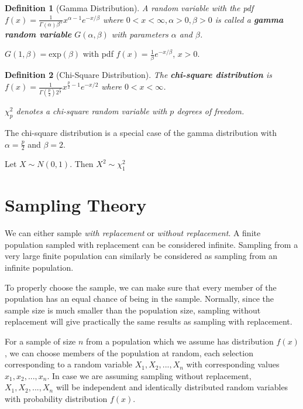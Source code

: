\documentclass[12pt,twoside]{report}
\newtheorem{defn}{Definition}
\begin{document}
\begin{defn}[Gamma Distribution]
    A random variable with the pdf $f(x) = \displaystyle  \frac{1}{\Gamma(\alpha) \beta^\alpha} x^{\alpha - 1} e^{-x/\beta}$ where $0 < x < \infty, \alpha > 0, \beta > 0$ is called a \textbf{gamma random variable} $G(\alpha, \beta)$ with parameters $\alpha$ and $\beta$. 
\end{defn}
$G(1, \beta) = \text{exp}(\beta)$ with pdf $f(x) = \frac{1}{\beta} e^{-x/\beta}$, $x > 0$.

\begin{defn}[Chi-Square Distribution]
    The \textbf{chi-square distribution} is \\
    $f(x) = \displaystyle \frac{1}{\Gamma(\frac{p}{2}) 2^{\frac{p}{2}}} x^{\frac{p}{2} - 1} e ^{-x/2}$ where $0 < x < \infty$.

    \vspace{0.5cm}
    $\chi_p^2$ denotes a chi-square random variable with $p$ degrees of freedom.
\end{defn}

The chi-square distribution is a special case of the gamma distribution with $\alpha = \frac{p}{2}$ and $\beta = 2$.

Let $X \sim N(0,1)$. Then $X^2 \sim \chi_1^2$

\section{Sampling Theory}
We can either sample \textit{with replacement} or \textit{without replacement}. A finite population sampled with replacement can be considered infinite. Sampling from a very large finite population can similarly be considered as sampling from an infinite population. 

To properly choose the sample, we can make sure that every member of the population has an equal chance of being in the sample.
Normally, since the sample size is much smaller than the population size, sampling without replacement will give practically the same results as sampling with replacement.

For a sample of size $n$ from a population which we assume has distribution $f(x)$, we can choose members of the population at random, each selection corresponding to a random variable $X_1, X_2, ..., X_n$ with corresponding values $x_1, x_2, ..., x_n$. In case we are assuming sampling without replacement, $X_1, X_2, ..., X_n$ will be independent and identically distributed random variables with probability distribution $f(x)$.
\end{document}
